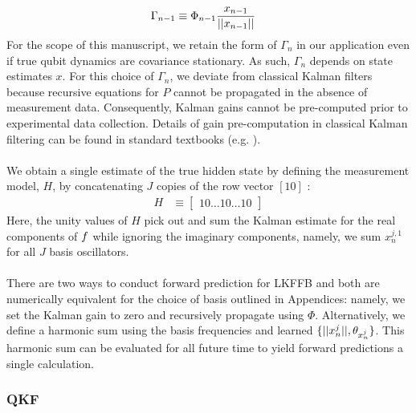 \begin{align}
\Gamma_{n-1} &\equiv \Phi_{n-1}\frac{x_{n-1}}{||x_{n-1}||}
\end{align}
For the scope of this manuscript, we retain the form of $\Gamma_{n}$ in our application even if true qubit dynamics are covariance stationary. As such, $\Gamma_{n}$ depends on state estimates $x$. For this choice of $\Gamma_{n}$, we deviate from classical Kalman filters because recursive equations for $P$ cannot be propagated in the absence of measurement data. Consequently, Kalman gains cannot be pre-computed prior to experimental data collection. Details of gain pre-computation in classical Kalman filtering can be found in standard textbooks (e.g. \cite{grewal2001theory}).
\\
\\
We obtain a single estimate of the true hidden state by defining the measurement model, $H$, by concatenating $J$ copies of the row vector $[1 0]$ :
\begin{align}
H & \equiv \begin{bmatrix} 1 0 \hdots 1 0 \hdots 1 0 \end{bmatrix}
\end{align}
Here, the unity values of $H$ pick out and sum the Kalman estimate for the real components of $f$ while ignoring the imaginary components, namely, we sum $x^{j,1}_{n}$ for all $J$ basis oscillators.
\\
\\
There are two ways to conduct forward prediction for LKFFB and both are numerically equivalent for the choice of basis outlined in Appendices: namely, we set the Kalman gain to zero and recursively propagate using $\Phi$. Alternatively, we define a harmonic sum using the basis frequencies and learned $\{||x^j_n||, \theta_{x^j_n} \}$.  This harmonic sum can be evaluated for all future time to yield forward predictions a single calculation. 

\subsubsection{QKF}

